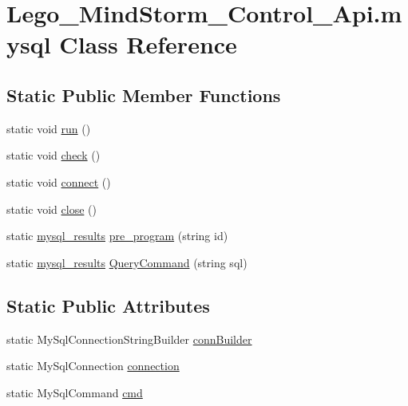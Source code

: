 \hypertarget{class_lego___mind_storm___control___api_1_1mysql}{
\section{Lego\_\-MindStorm\_\-Control\_\-Api.mysql Class Reference}
\label{class_lego___mind_storm___control___api_1_1mysql}
}
\subsection*{Static Public Member Functions}
\begin{CompactItemize}
\item 
static void \hyperlink{class_lego___mind_storm___control___api_1_1mysql_dde0f51507e171c68bbef9f07ed4cef3}{run} ()
\item 
static void \hyperlink{class_lego___mind_storm___control___api_1_1mysql_c8132164866e3aff6dd941913f7ea0de}{check} ()
\item 
static void \hyperlink{class_lego___mind_storm___control___api_1_1mysql_eaec7fca363869adc8cbbfa36c4952ba}{connect} ()
\item 
static void \hyperlink{class_lego___mind_storm___control___api_1_1mysql_fb55eb4f6dc95ad8fead2a77e912331e}{close} ()
\item 
static \hyperlink{class_lego___mind_storm___control___api_1_1mysql__results}{mysql\_\-results} \hyperlink{class_lego___mind_storm___control___api_1_1mysql_64de1afc554dfa7761e51309b9ebffd1}{pre\_\-program} (string id)
\item 
static \hyperlink{class_lego___mind_storm___control___api_1_1mysql__results}{mysql\_\-results} \hyperlink{class_lego___mind_storm___control___api_1_1mysql_71ccc07db776e71d07efa3e82a0da3b1}{QueryCommand} (string sql)
\end{CompactItemize}
\subsection*{Static Public Attributes}
\begin{CompactItemize}
\item 
static MySqlConnectionStringBuilder \hyperlink{class_lego___mind_storm___control___api_1_1mysql_aaba9d0e2a1876f660c668f20da90320}{connBuilder}
\item 
static MySqlConnection \hyperlink{class_lego___mind_storm___control___api_1_1mysql_71fe9f91ac2a14ef804254dab2937bf5}{connection}
\item 
static MySqlCommand \hyperlink{class_lego___mind_storm___control___api_1_1mysql_c19dd7025d5e2e077c5b1d5085a44d32}{cmd}
\end{CompactItemize}


